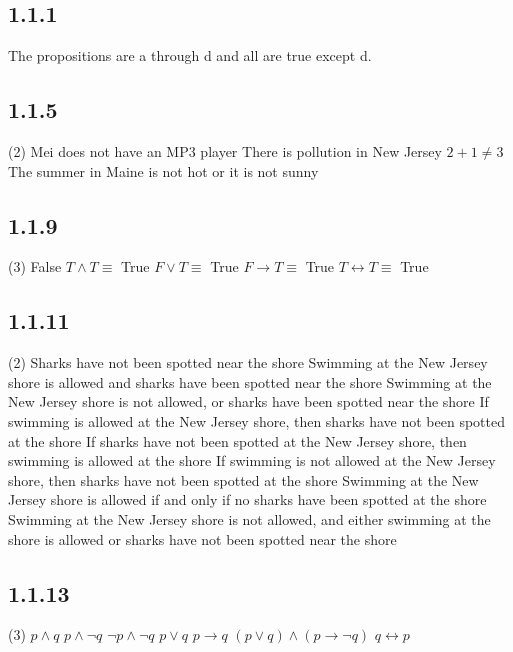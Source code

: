 \documentclass[12pt,titlepage]{extarticle}
\begin{document}
\subsection*{1.1.1}
The propositions are a through d and all are true except d.

\subsection*{1.1.5}
\begin{tasks}(2)
    \task Mei does not have an MP3 player
    \task There is pollution in New Jersey
    \task $2 + 1 \neq 3$
    \task The summer in Maine is not hot or it is not sunny
\end{tasks}

\subsection*{1.1.9}

%

\begin{tasks}(3)
    \task False
    \task $T \land T \equiv$ True
    \task $F \lor T \equiv$ True
    \task  $F \rightarrow T \equiv$ True
    \task $T \leftrightarrow T \equiv$ True
\end{tasks}

\subsection*{1.1.11}
\begin{tasks}(2)
    \task Sharks have not been spotted near the shore
    \task Swimming at the New Jersey shore is allowed and sharks have been spotted near the shore
    \task Swimming at the New Jersey shore is not allowed, or sharks have been spotted near the shore
    \task If swimming is allowed at the New Jersey shore, then sharks have not been spotted at the shore
    \task If sharks have not been spotted at the New Jersey shore, then swimming is allowed at the shore
    \task If swimming is not allowed at the New Jersey shore, then sharks have not been spotted at the shore
    \task Swimming at the New Jersey shore is allowed if and only if no sharks have been spotted at the shore
    \task Swimming at the New Jersey shore is not allowed, and either swimming at the shore is allowed or sharks have not been spotted near the shore
\end{tasks}

\subsection*{1.1.13}
\begin{tasks}(3)
    \task $p \land q$
    \task $p \land \lnot q$
    \task $\lnot p \land \lnot q$
    \task $p \lor q$
    \task $p \rightarrow q$
    \task $(p \lor q) \land (p \rightarrow \lnot q)$
    \task $q \leftrightarrow p$
\end{tasks}
\end{document}
